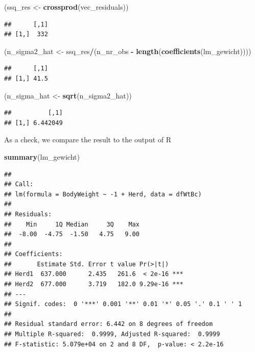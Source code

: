 \documentclass[]{article}
\newenvironment{Shaded}{\begin{snugshade}}{\end{snugshade}}
\newcommand{\KeywordTok}[1]{\textcolor[rgb]{0.13,0.29,0.53}{\textbf{#1}}}
\newcommand{\StringTok}[1]{\textcolor[rgb]{0.31,0.60,0.02}{#1}}
\newcommand{\OperatorTok}[1]{\textcolor[rgb]{0.81,0.36,0.00}{\textbf{#1}}}
\newcommand{\NormalTok}[1]{#1}
\begin{document}
\begin{Shaded}
\begin{Highlighting}[]
\NormalTok{(ssq_res <-}\StringTok{ }\KeywordTok{crossprod}\NormalTok{(vec_residuals))}
\end{Highlighting}
\end{Shaded}

\begin{verbatim}
##      [,1]
## [1,]  332
\end{verbatim}

\begin{Shaded}
\begin{Highlighting}[]
\NormalTok{(n_sigma2_hat <-}\StringTok{ }\NormalTok{ssq_res}\OperatorTok{/}\NormalTok{(n_nr_obs }\OperatorTok{-}\StringTok{ }\KeywordTok{length}\NormalTok{(}\KeywordTok{coefficients}\NormalTok{(lm_gewicht))))}
\end{Highlighting}
\end{Shaded}

\begin{verbatim}
##      [,1]
## [1,] 41.5
\end{verbatim}

\begin{Shaded}
\begin{Highlighting}[]
\NormalTok{(n_sigma_hat <-}\StringTok{ }\KeywordTok{sqrt}\NormalTok{(n_sigma2_hat))}
\end{Highlighting}
\end{Shaded}

\begin{verbatim}
##          [,1]
## [1,] 6.442049
\end{verbatim}

As a check, we compare the result to the output of R

\begin{Shaded}
\begin{Highlighting}[]
\KeywordTok{summary}\NormalTok{(lm_gewicht)}
\end{Highlighting}
\end{Shaded}

\begin{verbatim}
## 
## Call:
## lm(formula = BodyWeight ~ -1 + Herd, data = dfWtBc)
## 
## Residuals:
##    Min     1Q Median     3Q    Max 
##  -8.00  -4.75  -1.50   4.75   9.00 
## 
## Coefficients:
##       Estimate Std. Error t value Pr(>|t|)    
## Herd1  637.000      2.435   261.6  < 2e-16 ***
## Herd2  677.000      3.719   182.0 9.29e-16 ***
## ---
## Signif. codes:  0 '***' 0.001 '**' 0.01 '*' 0.05 '.' 0.1 ' ' 1
## 
## Residual standard error: 6.442 on 8 degrees of freedom
## Multiple R-squared:  0.9999, Adjusted R-squared:  0.9999 
## F-statistic: 5.079e+04 on 2 and 8 DF,  p-value: < 2.2e-16
\end{verbatim}
\end{document}
